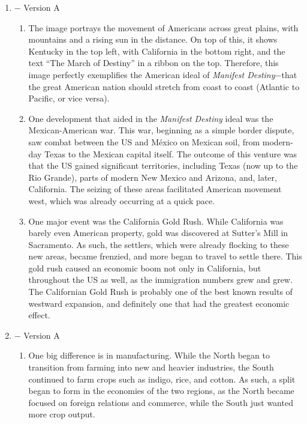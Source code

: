 \documentclass[12pt]{article}
\begin{document}
\begin{enumerate}

  \item $-$ Version A

    \begin{enumerate}

      \item The image portrays the movement of Americans across great plains, with mountains and a rising sun in the distance. On top of this, it shows Kentucky in the top left, with California in the bottom right, and the text ``The March of Destiny'' in a ribbon on the top. Therefore, this image perfectly exemplifies the American ideal of \textit{Manifest Destiny}$-$that the great American nation should stretch from coast to coast (Atlantic to Pacific, or vice versa).

      \item One development that aided in the \textit{Manifest Destiny} ideal was the Mexican-American war. This war, beginning as a simple border dispute, saw combat between the US and M\'exico on Mexican soil, from modern-day Texas to the Mexican capital itself. The outcome of this venture was that the US gained significant territories, including Texas (now up to the Rio Grande), parts of modern New Mexico and Arizona, and, later, California. The seizing of these areas facilitated American movement west, which was already occurring at a quick pace.

      \item One major event was the California Gold Rush. While California was barely even American property, gold was discovered at Sutter's Mill in Sacramento. As such, the settlers, which were already flocking to these new areas, became frenzied, and more began to travel to settle there. This gold rush caused an economic boom not only in California, but throughout the US as well, as the immigration numbers grew and grew. The Californian Gold Rush is probably one of the best known results of westward expansion, and definitely one that had the greatest economic effect.

    \end{enumerate}

  \item $-$ Version A

    \begin{enumerate}

      \item One big difference is in manufacturing. While the North began to transition from farming into new and heavier industries, the South continued to farm crops such as indigo, rice, and cotton. As such, a split began to form in the economies of the two regions, as the North became focused on foreign relations and commerce, while the South just wanted more crop output.


\end{enumerate}
\end{enumerate}
\end{document}
